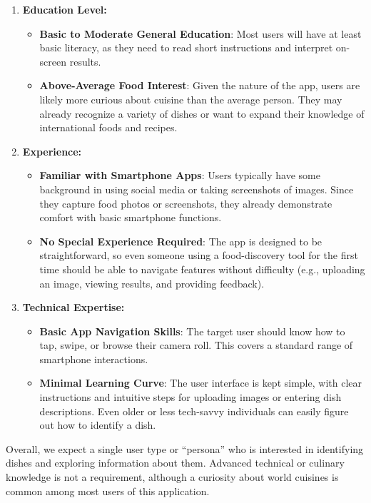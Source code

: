 \documentclass[]{article}
\begin{document}
\begin{enumerate}
    \item \textbf{Education Level:}
    \begin{itemize}
        \item \textbf{Basic to Moderate General Education}: Most users will have at least basic literacy, as they need to read short instructions and interpret on-screen results.
        \item \textbf{Above-Average Food Interest}: Given the nature of the app, users are likely more curious about cuisine than the average person. They may already recognize a variety of dishes or want to expand their knowledge of international foods and recipes.
    \end{itemize}
    
    \item \textbf{Experience:}
    \begin{itemize}
        \item \textbf{Familiar with Smartphone Apps}: Users typically have some background in using social media or taking screenshots of images. Since they capture food photos or screenshots, they already demonstrate comfort with basic smartphone functions.
        \item \textbf{No Special Experience Required}: The app is designed to be straightforward, so even someone using a food-discovery tool for the first time should be able to navigate features without difficulty (e.g., uploading an image, viewing results, and providing feedback).
    \end{itemize}
    
    \item \textbf{Technical Expertise:}
    \begin{itemize}
        \item \textbf{Basic App Navigation Skills}: The target user should know how to tap, swipe, or browse their camera roll. This covers a standard range of smartphone interactions.
        \item \textbf{Minimal Learning Curve}: The user interface is kept simple, with clear instructions and intuitive steps for uploading images or entering dish descriptions. Even older or less tech-savvy individuals can easily figure out how to identify a dish.
    \end{itemize}
\end{enumerate}

Overall, we expect a single user type or “persona” who is interested in identifying dishes and exploring information about them. Advanced technical or culinary knowledge is not a requirement, although a curiosity about world cuisines is common among most users of this application.
\end{document}
